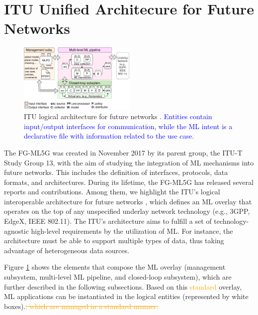 \documentclass[journal]{IEEEtran}
\begin{document}

\section{ITU Unified Architecure for Future Networks}
\label{section:itu_architecture}

\begin{figure}[!ht]
	\centering
	\includegraphics[width=0.5\textwidth]{itu_ml_architecture}
	\caption{ITU logical architecture for future networks \cite{itu2019architecture}. \textcolor{blue}{Entities contain input/output interfaces for communication, while the ML intent is a declarative file with information related to the use case.}}
	\label{fig:itu_ml_architecture}
\end{figure}

The FG-ML5G was created in November 2017 by its parent group, the ITU-T Study Group 13, with the aim of studying the integration of ML mechanisms into future networks. This includes the definition of interfaces, protocols, data formats, and architectures. During its lifetime, the FG-ML5G has released several reports and contributions. Among them, we highlight the ITU's logical interoperable architecture for future networks \cite{itu2019architecture}, which defines an ML overlay that operates on the top of any unspecified underlay network technology (e.g., 3GPP, EdgeX, IEEE 802.11). The ITU's architecture aims to fulfill a set of technology-agnostic high-level requirements by the utilization of ML. For instance, the architecture must be able to support multiple types of data, thus taking advantage of heterogeneous data sources. 

Figure \ref{fig:itu_ml_architecture} shows the elements that compose the ML overlay (management subsystem, multi-level ML pipeline, and closed-loop subsystem), which are further described in the following subsections. Based on this \textcolor{orange}{standard} overlay, ML applications can be instantiated in the logical entities (represented by white boxes).\textcolor{orange}{\st{, which are managed in a standard manner.}} %
\end{document}
